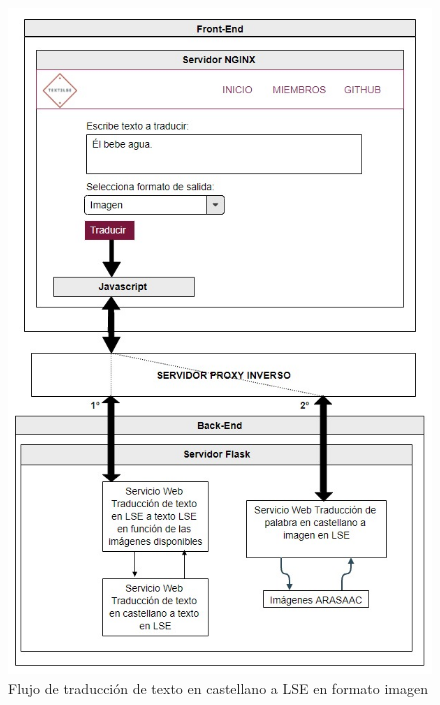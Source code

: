 \begin{figure}[]
	\centering
	\includegraphics[width=1\textwidth]{Imagenes/Fuentes/Text2LSE/esquemaTradImagen.jpg}
	\caption{ Flujo de traducción de texto en castellano a LSE en formato imagen }
	\label {fig: esquemaTradImagen}
\end{figure}


